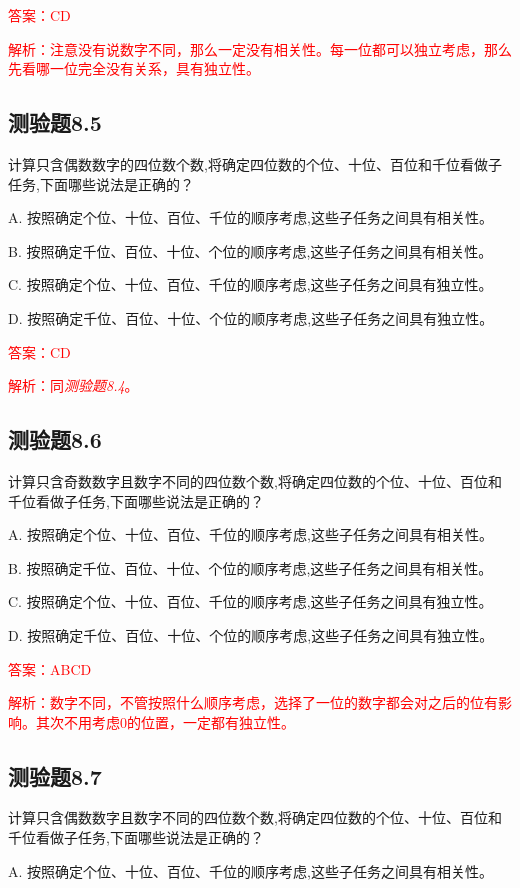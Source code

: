 \documentclass[UTF8, heading=true]{ctexart}
\begin{document}
\textcolor{red}{答案：CD}

\textcolor{red}{解析：注意没有说数字不同，那么一定没有相关性。每一位都可以独立考虑，那么先看哪一位完全没有关系，具有独立性。}


\subsection{测验题8.5}

计算只含偶数数字的四位数个数,将确定四位数的个位、十位、百位和千位看做子任务,下面哪些说法是正确的？

A. 按照确定个位、十位、百位、千位的顺序考虑,这些子任务之间具有相关性。

B. 按照确定千位、百位、十位、个位的顺序考虑,这些子任务之间具有相关性。

C. 按照确定个位、十位、百位、千位的顺序考虑,这些子任务之间具有独立性。

D. 按照确定千位、百位、十位、个位的顺序考虑,这些子任务之间具有独立性。

\textcolor{red}{答案：CD}

\textcolor{red}{解析：同\textit{测验题8.4}。}

\subsection{测验题8.6}

计算只含奇数数字且数字不同的四位数个数,将确定四位数的个位、十位、百位和千位看做子任务,下面哪些说法是正确的？

A. 按照确定个位、十位、百位、千位的顺序考虑,这些子任务之间具有相关性。

B. 按照确定千位、百位、十位、个位的顺序考虑,这些子任务之间具有相关性。

C. 按照确定个位、十位、百位、千位的顺序考虑,这些子任务之间具有独立性。

D. 按照确定千位、百位、十位、个位的顺序考虑,这些子任务之间具有独立性。

\textcolor{red}{答案：ABCD}

\textcolor{red}{解析：数字不同，不管按照什么顺序考虑，选择了一位的数字都会对之后的位有影响。其次不用考虑0的位置，一定都有独立性。}

\subsection{测验题8.7}
计算只含偶数数字且数字不同的四位数个数,将确定四位数的个位、十位、百位和千位看做子任务,下面哪些说法是正确的？

A. 按照确定个位、十位、百位、千位的顺序考虑,这些子任务之间具有相关性。
\end{document}
